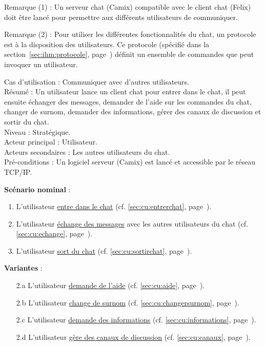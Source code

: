 \medskip
Remarque (1) : Un serveur chat (Camix) compatible avec le client chat (Felix) doit être lancé pour permettre aux différents utilisateurs de communiquer.

\smallskip
Remarque (2) : Pour utiliser les différentes fonctionnalités du chat, un protocole est à la disposition des utilisateurs. Ce protocole (spécifié dans la section~\ref{sec:ihm:protocole}, page~\pageref{sec:ihm:protocole}) définit un ensemble de commandes que peut invoquer un utilisateur.

\medskip
\noindent
Cas d'utilisation : Communiquer avec d'autres utilisateurs.\\
Résumé : Un utilisateur lance un client chat pour entrer dans le chat, il peut ensuite échanger des messages, demander de l'aide sur les commandes du chat, changer de surnom, demander des informations, gérer des canaux de discussion et sortir du chat. \\
Niveau : Stratégique.\\
Acteur principal : Utilisateur.\\
Acteurs secondaires : Les autres utilisateurs du chat.\\
Pré-conditions : Un logiciel serveur (Camix) est lancé et accessible par le réseau TCP/IP.

\medskip
\textbf{Scénario nominal} :
\begin{enumerate}
\item L'utilisateur \underline{entre dans le chat} (cf. \ref{sec:cu:entrerchat}, page~\pageref{sec:cu:entrerchat}).
\item L'utilisateur \underline{échange des messages} avec les autres utilisateurs du chat (cf. \ref{sec:cu:echange}, page~\pageref{sec:cu:echange}).
\item L'utilisateur \underline{sort du chat} (cf. \ref{sec:cu:sortirchat}, page~\pageref{sec:cu:sortirchat}).
\end{enumerate}

\medskip
\textbf{Variantes} :
\begin{enumerate}
\item[2.a] L'utilisateur \underline{demande de l'aide} (cf. \ref{sec:cu:aide}, page~\pageref{sec:cu:aide}).
\item[2.b] L'utilisateur \underline{change de surnom} (cf. \ref{sec:cu:changersurnom}, page~\pageref{sec:cu:changersurnom}).
\item[2.c] L'utilisateur \underline{demande des informations} (cf. \ref{sec:cu:informations}, page~\pageref{sec:cu:informations}).
\item[2.d] L'utilisateur \underline{gère des canaux de discussion} (cf. \ref{sec:cu:canaux}, page~\pageref{sec:cu:canaux}).
\end{enumerate}

